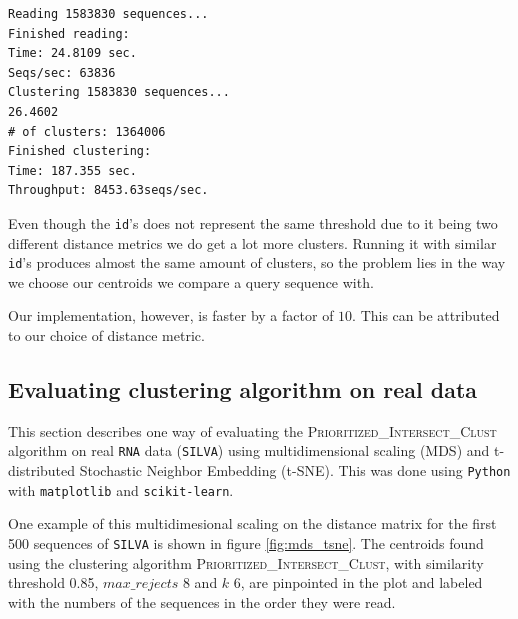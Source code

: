 \begin{lstlisting}[style=output-style]
Reading 1583830 sequences...
Finished reading:
Time: 24.8109 sec.
Seqs/sec: 63836
Clustering 1583830 sequences...
26.4602
# of clusters: 1364006
Finished clustering:
Time: 187.355 sec.
Throughput: 8453.63seqs/sec.
\end{lstlisting}

Even though the \texttt{id}'s does not represent the same threshold due to it
being two different distance metrics we do get a lot more clusters. Running
it with similar \texttt{id}'s produces almost the same amount of clusters, so
the problem lies in the way we choose our centroids we compare a query
sequence with.

Our implementation, however, is faster by a factor of $10$. This can be
attributed to our choice of distance metric.



\subsection{Evaluating clustering algorithm on real data}

This section describes one way of evaluating the
\textsc{Prioritized\_Intersect\_Clust} algorithm on real \texttt{RNA} data
(\texttt{SILVA}) using multidimensional scaling (MDS) and t-distributed
Stochastic Neighbor Embedding (t-SNE). This was done using \texttt{Python} with
\texttt{matplotlib} and \texttt{scikit-learn}.

One example of this
multidimesional scaling on the distance matrix for the first 500 sequences of
\texttt{SILVA} is shown in figure \ref{fig:mds_tsne}. The centroids found using
the clustering algorithm \textsc{Prioritized\_Intersect\_Clust}, with similarity
threshold 0.85, $max\_rejects$ 8 and $k$ 6, are pinpointed in the plot and
labeled with the numbers of the sequences in the order they were read.

